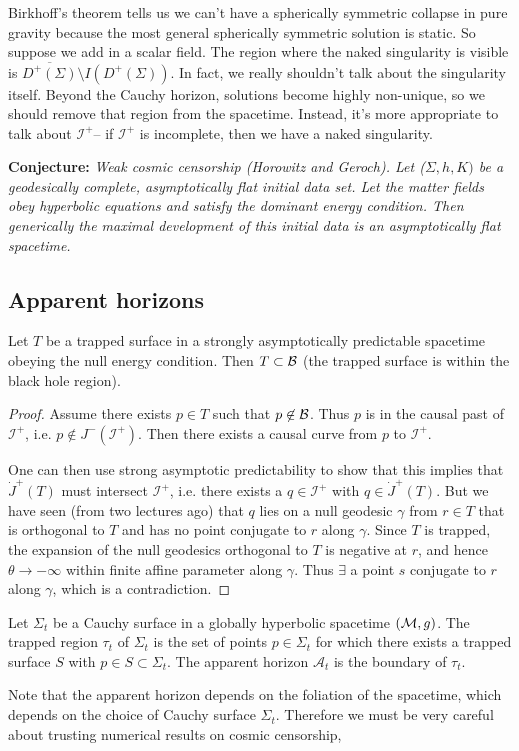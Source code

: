 Birkhoff's theorem tells us we can't have a spherically symmetric collapse in pure gravity because the most general spherically symmetric solution is static. So suppose we add in a scalar field. The region where the naked singularity is visible is $\overline{D^+(\Sigma)}\setminus I(D^+(\Sigma))$.
In fact, we really shouldn't talk about the singularity itself. Beyond the Cauchy horizon, solutions become highly non-unique, so we should remove that region from the spacetime. Instead, it's more appropriate to talk about $\mathcal{I}^+$-- if $\mathcal{I}^+$ is incomplete, then we have a naked singularity.

\textbf{Conjecture:} \textit{Weak cosmic censorship (Horowitz and Geroch). Let ($\Sigma, h, K)$ be a geodesically complete, asymptotically flat initial data set. Let the matter fields obey hyperbolic equations and satisfy the dominant energy condition. Then generically the maximal development of this initial data is an asymptotically flat spacetime.}

\subsection*{Apparent horizons}
\begin{thm}
    Let $T$ be a trapped surface in a strongly asymptotically predictable spacetime obeying the null energy condition. Then $T\subset \mathcal{B}$ (the trapped surface is within the black hole region).
\end{thm}
\begin{proof}
    Assume there exists $p\in T$ such that $p\not \in \mathcal{B}$. Thus $p$ is in the causal past of $\mathcal{I}^+$, i.e. $p\notin J^-(\mathcal{I}^+).$ Then there exists a causal curve from $p$ to $\mathcal{I}^+$.
    
    One can then use strong asymptotic predictability to show that this implies that $\dot J^+(T)$ must intersect $\mathcal{I}^+$, i.e. there exists a $q\in \mathcal{I}^+$ with $q\in \dot J^+(T)$. But we have seen (from two lectures ago) that $q$ lies on a null geodesic $\gamma$ from $r\in T$ that is orthogonal to $T$ and has no point conjugate to $r$ along $\gamma$. Since $T$ is trapped, the expansion of the null geodesics orthogonal to $T$ is negative at $r$, and hence $\theta\to -\infty$ within finite affine parameter along $\gamma$. Thus $\exists$ a point $s$ conjugate to $r$ along $\gamma$, which is a contradiction.
\end{proof}

\begin{defn}
    Let $\Sigma_t$ be a Cauchy surface in a globally hyperbolic spacetime $(\mathcal{M},g)$. The trapped region $\tau_t$ of $\Sigma_t$ is the set of points $p\in \Sigma_t$ for which there exists a trapped surface $S$ with $p\in S \subset \Sigma_t$. The apparent horizon $\mathcal{A}_t$ is the boundary of $\tau_t$.
\end{defn}
Note that the apparent horizon depends on the foliation of the spacetime, which depends on the choice of Cauchy surface $\Sigma_t$. Therefore we must be very careful about trusting numerical results on cosmic censorship, 